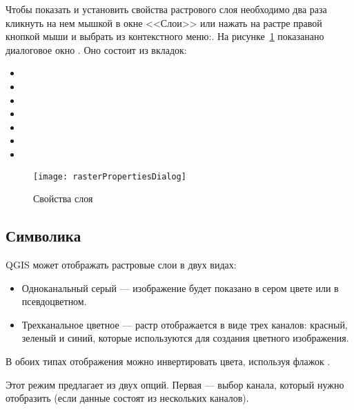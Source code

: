 Чтобы показать и установить свойства растрового слоя необходимо два раза
кликнуть на нем мышкой в окне <<Слои>> или нажать на растре правой
кнопкой мыши и выбрать  из контекстного
меню:. На рисунке~\ref{fig:raster_properties}
показанано диалоговое окно . Оно состоит из
вкладок:

\begin{itemize}[label=--]
 \item {}
 \item {}
 \item {}
 \item {}
 \item {}
 \item {}
 \item {}
\end{itemize}

\begin{figure}[h]
  \centering
   \texttt{[image: rasterPropertiesDialog]}
   \caption{Свойства слоя \nixcaption}\label{fig:raster_properties}
\end{figure}

\subsection{Символика}\label{label_symbology}

QGIS может отображать растровые слои в двух видах:

\begin{itemize}[label=--]
\item Одноканальный серый --- изображение будет показано в сером цвете
или в псевдоцветном. %
\item Трехканальное цветное --- растр отображается в виде трех каналов:
красный, зеленый и синий, которые используются для создания цветного
изображения.
\end{itemize}

В обоих типах отображения можно инвертировать цвета, используя флажок
. %


Этот режим предлагает из двух опций. Первая --- выбор канала, который
нужно отобразить (если данные состоят из нескольких каналов).

